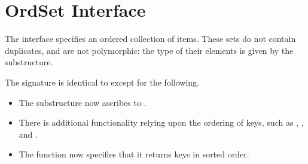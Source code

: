 \chapter{OrdSet Interface}
\label{ch:ordset-interface}
\begin{preamble}
The  interface specifies an ordered collection of items. These sets
do not contain duplicates, and are not polymorphic: the type of their
elements is given by the  substructure.
\end{preamble}

\begin{note}
The  signature is identical to  except for the following.
\begin{itemize}
  \item The  substructure now ascribes to .
  \item There is additional functionality relying upon the ordering of keys,
  such as , , and .
  \item The  function now specifies that it returns keys in sorted order.
\end{itemize}
\end{note}

